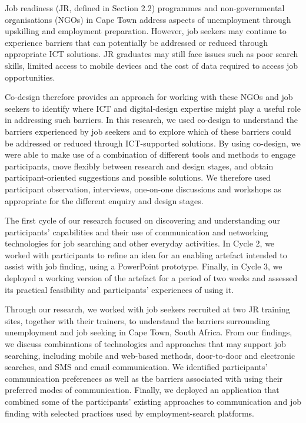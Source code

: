 Job readiness (JR, defined in Section 2.2) programmes and non-governmental organisations (NGOs) in Cape Town address aspects of unemployment through upskilling and employment preparation. However, job seekers may continue to experience barriers that can potentially be addressed or reduced through appropriate ICT solutions. JR graduates may still face issues such as poor search skills, limited access to mobile devices and the cost of data required to access job opportunities.

Co-design therefore provides an approach for working with these NGOs and job seekers to identify where ICT and digital-design expertise might play a useful role in addressing such barriers. In this research, we used co-design to understand the barriers experienced by job seekers and to explore which of these barriers could be addressed or reduced through ICT-supported solutions. By using co-design, we were able to make use of a combination of different tools and methods to engage participants, move flexibly between research and design stages, and obtain participant-oriented suggestions and possible solutions. We therefore used participant observation, interviews, one-on-one discussions and workshops as appropriate for the different enquiry and design stages.

The first cycle of our research focused on discovering and understanding our participants' capabilities and their use of communication and networking technologies for job searching and other everyday activities. In Cycle 2, we worked with participants to refine an idea for an enabling artefact intended to assist with job finding, using a PowerPoint prototype. Finally, in Cycle 3, we deployed a working version of the artefact for a period of two weeks and assessed its practical feasibility and participants' experiences of using it.

Through our research, we worked with job seekers recruited at two JR training sites, together with their trainers, to understand the barriers surrounding unemployment and job seeking in Cape Town, South Africa. From our findings, we discuss combinations of technologies and approaches that may support job searching, including mobile and web-based methods, door-to-door and electronic searches, and SMS and email communication. We identified participants' communication preferences as well as the barriers associated with using their preferred modes of communication. Finally, we deployed an application that combined some of the participants' existing approaches to communication and job finding with selected practices used by employment-search platforms.

